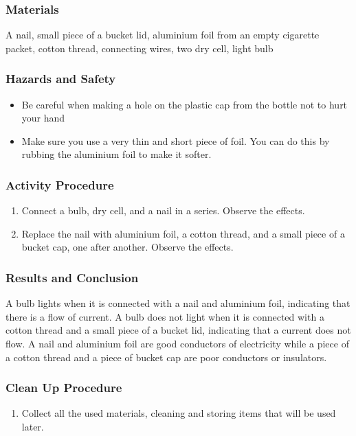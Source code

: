 \subsubsection*{Materials}
A nail, small piece of a bucket lid, aluminium foil from an empty cigarette packet, cotton thread, connecting wires, two dry cell, light bulb

\subsubsection*{Hazards and Safety}
\begin{itemize}
\item{Be careful when making a hole on the plastic cap from the bottle not to hurt your hand}
\item{Make sure you use a very thin and short piece of foil. You can do this by rubbing the aluminium foil to make it softer.} 
\end{itemize}

\subsubsection*{Activity Procedure}
\begin{enumerate}
\item{Connect a bulb, dry cell, and a nail in a series. Observe the effects.} 
\item{Replace the nail with aluminium foil, a cotton thread, and a small piece of a bucket cap, one after another. Observe the effects.} 
\end{enumerate}

\subsubsection*{Results and Conclusion}
A bulb lights when it is connected with a nail and aluminium foil, indicating that there is a flow of current. A bulb does not light when it is connected with a cotton thread and a small piece of a bucket lid, indicating that a current does not flow. A nail and aluminium foil are good conductors of electricity while a piece of a cotton thread and a piece of bucket cap are poor conductors or insulators.

\subsubsection*{Clean Up Procedure}
\begin{enumerate}
\item{Collect all the used materials, cleaning and storing items that will be used later.} 
\end{enumerate}

